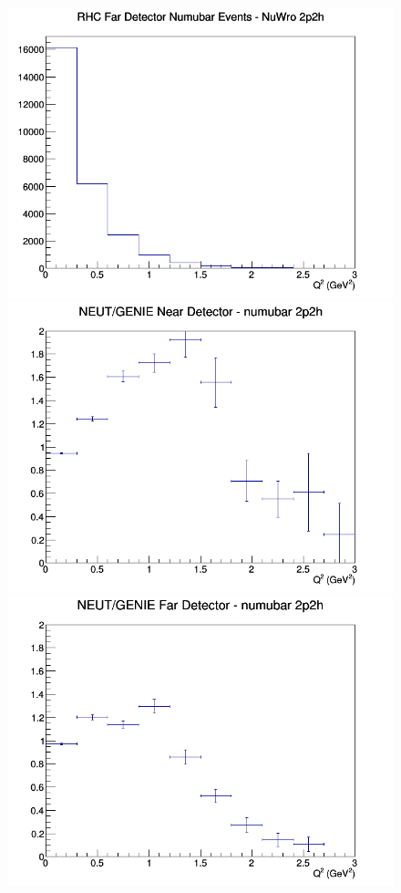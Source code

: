 \begin{figure}[h]
\endminipage
{}
\includegraphics[width=\linewidth]{eff_Q2/LAr/2p2h_RHC_FD_numubar_Q2_NuWro.png}
\endminipage
\newline
{}
\includegraphics[width=\linewidth]{eff_Q2/LAr/ratios/2p2h_NEUT_GENIE_numubar_near_Q2.png}
\endminipage
{}
\includegraphics[width=\linewidth]{eff_Q2/LAr/ratios/2p2h_NEUT_GENIE_numubar_far_Q2.png}

\end{figure}
